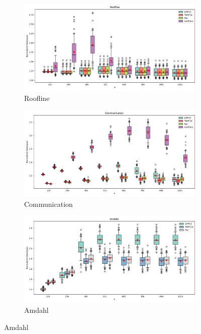 \documentclass{article}
\begin{document}
\begin{figure}[htbp]
\centering
\begin{subfigure}[b]{0.32\textwidth}\includegraphics[width=\textwidth]{Results/P/P_Roofline_boxplot}\caption{Roofline}\label{fig:boxplot_figures_P_Roofline}\end{subfigure}
\hfill
\begin{subfigure}[b]{0.32\textwidth}\includegraphics[width=\textwidth]{Results/P/P_Communication_boxplot}\caption{Communication}\label{fig:boxplot_figures_P_Communication}\end{subfigure}
\hfill
\begin{subfigure}[b]{0.32\textwidth}\includegraphics[width=\textwidth]{Results/P/P_Amdahl_boxplot}\caption{Amdahl}\label{fig:boxplot_figures_P_Amdahl}\end{subfigure}

\end{figure}
\end{document}
